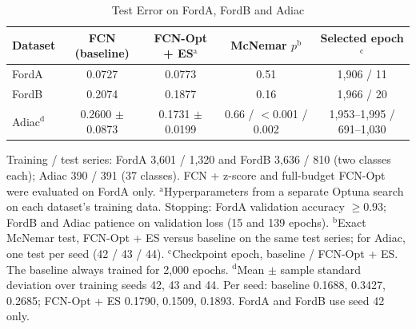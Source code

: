 \begin{table}[htbp]
\caption{Test Error on FordA, FordB and Adiac}
\begin{center}
\begin{tabular}{|l|c|c|c|c|}
\hline
\textbf{Dataset} & \textbf{FCN (baseline)} & \textbf{FCN-Opt + ES}$^{\mathrm{a}}$ & \textbf{McNemar $p$}$^{\mathrm{b}}$ & \textbf{Selected epoch}$^{\mathrm{c}}$ \\
\hline
FordA & 0.0727 & 0.0773 & 0.51 & 1,906 / 11 \\
\hline
FordB & 0.2074 & 0.1877 & 0.16 & 1,966 / 20 \\
\hline
Adiac$^{\mathrm{d}}$ & 0.2600 $\pm$ 0.0873 & 0.1731 $\pm$ 0.0199 & 0.66 / $<$0.001 / 0.002 & 1,953--1,995 / 691--1,030 \\
\hline
\end{tabular}
\end{center}
\vspace{1mm}
\begin{minipage}{\textwidth}
\footnotesize
Training / test series: FordA 3,601 / 1,320 and FordB 3,636 / 810 (two classes each); Adiac 390 / 391 (37 classes).
FCN + z-score and full-budget FCN-Opt were evaluated on FordA only.
$^{\mathrm{a}}$Hyperparameters from a separate Optuna search on each dataset's training data. Stopping: FordA validation accuracy $\geq 0.93$; FordB and Adiac patience on validation loss (15 and 139 epochs).
$^{\mathrm{b}}$Exact McNemar test, FCN-Opt + ES versus baseline on the same test series; for Adiac, one test per seed (42 / 43 / 44).
$^{\mathrm{c}}$Checkpoint epoch, baseline / FCN-Opt + ES. The baseline always trained for 2,000 epochs.
$^{\mathrm{d}}$Mean $\pm$ sample standard deviation over training seeds 42, 43 and 44. Per seed: baseline 0.1688, 0.3427, 0.2685; FCN-Opt + ES 0.1790, 0.1509, 0.1893. FordA and FordB use seed 42 only.
\end{minipage}
\label{tab:cross_dataset}
\end{table}
